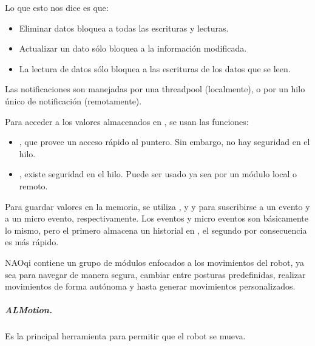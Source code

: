 Lo que esto nos dice es que:
\begin{itemize}
\item {} 
Eliminar datos bloquea a todas las escrituras y lecturas.

\item {} 
Actualizar un dato sólo bloquea a la información modificada.

\item {} 
La lectura de datos sólo bloquea a las escrituras de los datos que se leen.

\end{itemize}

Las notificaciones son manejadas por una threadpool (localmente), o por un
hilo único de notificación (remotamente).


Para acceder a los valores almacenados en , se usan las funciones:
\begin{itemize}
\item {} 
, que provee un acceso rápido al puntero. Sin embargo, no hay seguridad en el hilo.

\item {} 
, existe seguridad en el hilo. Puede ser usado ya sea por un módulo local o remoto.

\end{itemize}

Para guardar valores en la memoria, se utiliza , y
 y 
para suscribirse a un evento y a un micro evento, respectivamente. Los eventos
y micro eventos son básicamente lo mismo, pero el primero almacena un historial
en , el segundo por consecuencia es más rápido.

NAOqi contiene un grupo de módulos enfocados a los movimientos del robot,
ya sea para navegar de manera segura, cambiar entre posturas predefinidas,
realizar movimientos de forma autónoma y hasta generar movimientos
personalizados.


\subparagraph{ALMotion.}
\label{\detokenize{chapter_one/naoqi:almotion}}
Es la principal herramienta para permitir que el robot se mueva.

